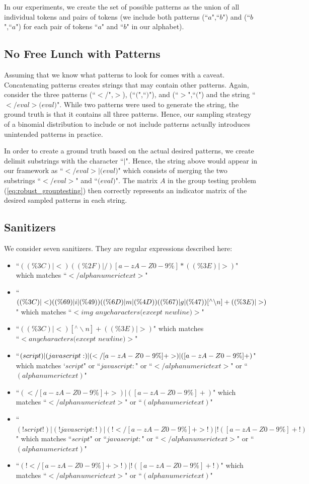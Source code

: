 In our experiments, we create the set of possible patterns as the union of all individual tokens and pairs of tokens (we include both patterns (``$a$",``$b$") and (``$b$",``$a$") for each pair of tokens ``$a$" and ``$b$" in our alphabet).

\subsection{No Free Lunch with Patterns}
Assuming that we know what patterns to look for comes with a caveat. Concatenating patterns creates strings that may contain other patterns. Again, consider the three patterns (``$<$/",$>$), (``$($",``$)$"), and (``$>$",``$($") and the string  ``$<$$/eval$$>$$($$eval$$)$". While two patterns were used to generate the string, the ground truth is that it contains all three patterns. Hence, our sampling strategy of a binomial distribution to include or not include patterns actually introduces unintended patterns in practice. 

In order to create a ground truth based on the actual desired patterns, we create delimit substrings with the character ``$|$".  Hence, the string above would appear in our framework as 
``$<$$/eval$$>$$|$$($$eval$$)$" which consists of merging the two substrings ``$<$$/eval$$>$" and ``$($$eval$$)$". The matrix $A$ in the group testing problem (\ref{eq:robust_grouptesting}) then correctly represents an indicator matrix of the desired sampled patterns in each string.

\subsection{Sanitizers}
We consider seven sanitizers. They are regular expressions described here:
\begin{itemize}
	\item ``$((\%3C)|<)((\%2F)|/)[a-zA-Z0-9\%]*((\%3E)|>)$" which matches ``$</alphanumerictext>$"
	\item ``$((\%3C)|<)((\%69)|i|(\%49))((\%6D)|m|(\%4D))\\((\%67)|g|(\%47))[^\wedge\backslash n]+((\%3E)|>)$" which matches ``$<img$ $anycharacters(except$ $newline)>$"
	\item ``$((\%3C)|<)[^\wedge\backslash n]+((\%3E)|>)$" which matches \\``$<anycharacters(except$ $newline)>$"
	\item ``$(script)|(javascript:)|(</[a-zA-Z0-9\%]+>)\\|([a-zA-Z0-9\%]+)$" which matches `$script$" or ``$javascript:$" or ``$</alphanumerictext>$" or ``$(alphanumerictext)$"
	\item ``$(</[a-zA-Z0-9\%]+>)|([a-zA-Z0-9\%]+)$" which matches ``$</alphanumerictext>$" or ``$(alphanumerictext)$"
	\item ``$(!script!)|(!javascript:!)|(!</[a-zA-Z0-9\%]+>!)|!([a-zA-Z0-9\%]+!)$" which matches ``$script$" or ``$javascript:$" or ``$</alphanumerictext>$" or ``$(alphanumerictext)$"
	\item ``$(!</[a-zA-Z0-9\%]+>!)|!([a-zA-Z0-9\%]+!)$" which matches ``$</alphanumerictext>$" or ``$(alphanumerictext)$"
\end{itemize}

